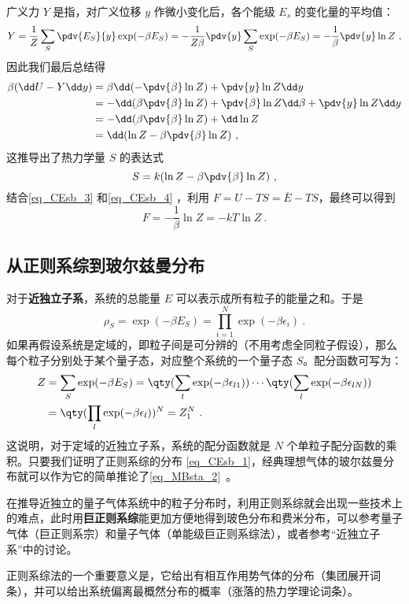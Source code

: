 广义力 $Y$ 是指，对广义位移 $y$ 作微小变化后，各个能级 $E_s$ 的变化量的平均值：
\begin{equation}
Y=\frac{1}{Z} \sum_S \pdv{E_S}{y} \exp(-\beta E_S)=-\frac{1}{Z\beta}\pdv{y} \sum_S\exp(-\beta E_S)=-\frac{1}{\beta} \pdv{y} \ln Z~,
\end{equation}
因此我们最后总结得
\begin{equation}
\begin{aligned}
\beta(\dd U-Y\dd y)&=\beta \dd (-\pdv{\beta} \ln Z)+\pdv{y} \ln Z\dd y\\
&= -\dd(\beta\pdv{\beta} \ln Z)+\pdv{\beta}\ln Z\dd \beta +\pdv{y} \ln Z\dd y\\
&= -\dd(\beta\pdv{\beta} \ln Z)+\dd \ln Z\\
&=\dd (\ln Z-\beta\pdv{\beta} \ln Z)~,
\end{aligned}
\end{equation}
这推导出了热力学量 $S$ 的表达式
\begin{equation}\label{eq_CEsb_4}
S=k(\ln Z-\beta\pdv{\beta}\ln Z)~,
\end{equation}
结合\autoref{eq_CEsb_3} 和\autoref{eq_CEsb_4} ，利用 $F=U-TS=\bar E-TS$，最终可以得到
\begin{equation}
F=-\frac{1}{\beta}\ln Z=-kT\ln Z~.
\end{equation}



\subsection{从正则系综到玻尔兹曼分布}
对于\textbf{近独立子系}，系统的总能量 $E$ 可以表示成所有粒子的能量之和。于是
\begin{equation}
\rho_S=\exp(-\beta E_S)=\prod_{i=1}^N\exp(-\beta\epsilon_i)~.
\end{equation}
如果再假设系统是定域的，即粒子间是可分辨的（不用考虑全同粒子假设），那么每个粒子分别处于某个量子态，对应整个系统的一个量子态 $S$。配分函数可写为：
\begin{equation}
\begin{aligned}
Z&=\sum_S\exp(-\beta E_S)=\qty(\sum_{l}\exp(-\beta\epsilon_{l1}))\cdots\qty(\sum_{l}\exp(-\beta\epsilon_{lN}))\\
&=\qty(\prod_{l}\exp(-\beta\epsilon_{l}))^N=Z_1^N~.
\end{aligned}
\end{equation}
这说明，对于定域的近独立子系，系统的配分函数就是 $N$ 个单粒子配分函数的乘积。只要我们证明了正则系综的分布 \autoref{eq_CEsb_1}，经典理想气体的玻尔兹曼分布就可以作为它的简单推论了\autoref{eq_MBsta_2}~。

在推导近独立的量子气体系统中的粒子分布时，利用正则系综就会出现一些技术上的难点，此时用\textbf{巨正则系综}能更加方便地得到玻色分布和费米分布，可以参考量子气体（巨正则系宗）和量子气体（单能级巨正则系综法），或者参考“近独立子系”中的讨论。

正则系综法的一个重要意义是，它给出有相互作用势气体的分布（集团展开词条），并可以给出系统偏离最概然分布的概率（涨落的热力学理论词条）。
